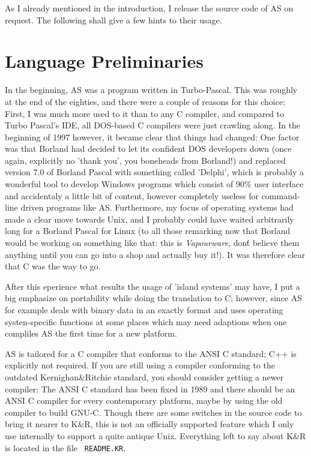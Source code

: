 \documentclass[12pt,twoside]{report}
\begin{document}
As I already mentioned in the introduction, I release the source code of
AS on request.  The following shall give a few hints to their usage.


\section{Language Preliminaries}

In the beginning, AS was a program written in Turbo-Pascal.  This was
roughly at the end of the eighties, and there were a couple of reasons for
this choice: First, I was much more used to it than to any C compiler, and
compared to Turbo Pascal's IDE, all DOS-based C compilers were just
crawling along.  In the beginning of 1997 however, it became clear that
things had changed: One factor was that Borland had decided to let its
confident DOS developers down (once again, explicitly no 'thank you', you
boneheads from Borland!) and replaced version 7.0 of Borland Pascal with
something called 'Delphi', which is probably a wonderful tool to develop
Windows programs which consist of 90\% user interface and accidentaly a
little bit of content, however completely useless for command-line driven
programs like AS.  Furthermore, my focus of operating systems had made a
clear move towards Unix, and I probably could have waited arbitrarily long
for a Borland Pascal for Linux (to all those remarking now that Borland
would be working on something like that: this is {\em Vapourware}, don\'t
believe them anything until you can go into a shop and actually buy it!). 
It was therefore clear that C was the way to go.

After this eperience what results the usage of 'island systems' may have,
I put a big emphasize on portability while doing the translation to C;
however, since AS for example deals with binary data in an exactly format
and uses operating systen-specific functions at some places which may need
adaptions when one compliles AS the first time for a new platform.

AS is tailored for a C compiler that conforms to the ANSI C standard; C++
is explicitly not required.  If you are still using a compiler conforming
to the outdated Kernighan\&Ritchie standard, you should consider getting a
newer compiler: The ANSI C standard has been fixed in 1989 and there
should be an ANSI C compiler for every contemporary platform, maybe by
using the old compiler to build GNU-C.  Though there are some switches in
the source code to bring it nearer to K\&R, this is not an officially
supported feature which I only use internally to support a quite antique
Unix.  Everything left to say about K\&R is located in the file {\tt
README.KR}.
\end{document}
